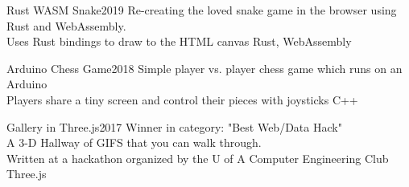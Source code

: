 
\begin{projects}
    \project
    {Rust WASM Snake}{2019}
    {}
    {Re-creating the loved snake game in the browser using Rust and WebAssembly.\\
    Uses Rust bindings to draw to the HTML canvas}
    {Rust, WebAssembly}

    \project
    {Arduino Chess Game}{2018}
    {}
    {Simple player vs. player chess game which runs on an Arduino\\
      Players share a tiny screen and control their pieces with joysticks}
    {C++}

	\project
	{Gallery in Three.js}{2017}
	{}
	{
            Winner in category: "Best Web/Data Hack"\\
            A 3-D Hallway of GIFS that you can walk through.\\
            Written at a hackathon organized by the U of A Computer Engineering Club 
    }
    {Three.js}
				

\end{projects}
